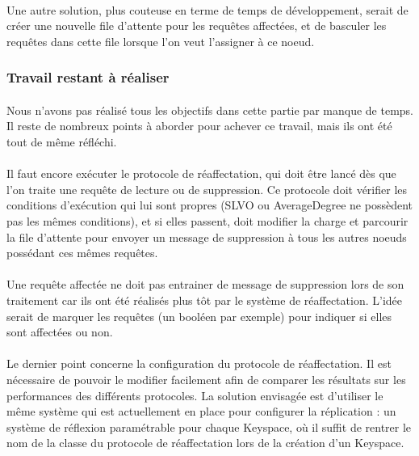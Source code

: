 \documentclass[12pt]{article}
\begin{document}
\paragraph{}Une autre solution, plus couteuse en terme de temps de développement, serait de créer une nouvelle file d'attente pour les requêtes affectées, et de basculer les requêtes dans cette file lorsque l'on veut l'assigner à ce noeud.

\subsubsection*{Travail restant à réaliser}

\paragraph{}Nous n'avons pas réalisé tous les objectifs dans cette partie par manque de temps. Il reste de nombreux points à aborder pour achever ce travail, mais ils ont été tout de même réfléchi.

\paragraph{}Il faut encore exécuter le protocole de réaffectation, qui doit être  lancé dès que l'on traite une requête de lecture ou de suppression. Ce protocole doit vérifier les conditions d'exécution qui lui sont propres (SLVO ou AverageDegree ne possèdent pas les mêmes conditions), et si elles passent, doit modifier la charge et parcourir la file d'attente pour envoyer un message de suppression à tous les autres noeuds possédant ces mêmes requêtes.

\paragraph{}Une requête affectée ne doit pas entrainer de message de suppression lors de son traitement car ils ont été réalisés plus tôt par le système de réaffectation. L'idée serait de marquer les requêtes (un booléen par exemple) pour indiquer si elles sont affectées ou non.

\paragraph{}Le dernier point concerne la configuration du protocole de réaffectation. Il est nécessaire de pouvoir le modifier facilement afin de comparer les résultats sur les performances des différents protocoles. La solution envisagée est d'utiliser le même système qui est actuellement en place pour configurer la réplication : un système de réflexion paramétrable pour chaque Keyspace, où il suffit de rentrer le nom de la classe du protocole de réaffectation lors de la création d'un Keyspace.
\end{document}
